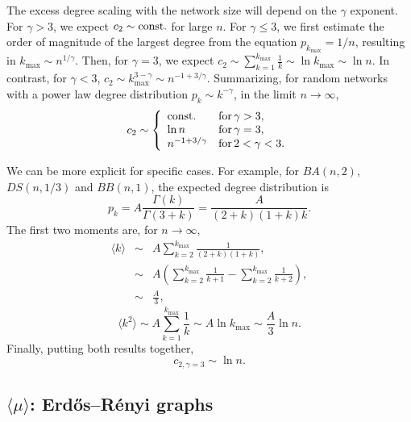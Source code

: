 \documentclass[reprint,aps,pre,amsmath,amssymb,superscriptaddress,showpacs]{revtex4-1}
\begin{document}
The excess degree scaling with the network size will depend on the $\gamma$ exponent. For $\gamma>3$, we expect $c_2\sim {\rm const.}$ for large $n$. For $\gamma \leq 3$, we first estimate the order of magnitude of the largest degree from the equation $p_{k_{\max}} =1/n$, resulting in $k_{\max}\sim n^{1/\gamma}$. Then, for $\gamma=3$, we expect $c_2 \sim \sum_{k=1}^{k_{\max}} \frac{1}{k} \sim \ln k_{\max} \sim \ln n$. In contrast, for $\gamma<3$, $c_2 \sim k_{\max}^{3-\gamma} \sim n^{-1 + 3/\gamma }$. Summarizing, for random networks with a power law degree distribution $p_k\sim k^{-\gamma}$, in the limit $n\rightarrow\infty$,
%
\begin{equation}
c_2 \sim \left\{
\begin{array}{ll}
{\rm const.} & {\rm for\,}\gamma>3,\\
\ln n & {\rm for\,}\gamma=3,\\
n^{-1 + 3/\gamma } & {\rm for\,} 2<\gamma<3.
\end{array}
\right.
\label{c2N}
\end{equation}

We can be more explicit for specific cases. For example, for $BA(n, 2)$, $DS(n, 1/3)$ and $BB(n, 1)$, the expected degree distribution is
%
\begin{equation}
p_k = A\frac{\Gamma(k)}{\Gamma(3+k)} = \frac{A}{(2+k)(1+k)k}.
\end{equation}
%
The first two moments are, for $n\rightarrow\infty$,
%
\begin{eqnarray}
\langle k\rangle &\sim& A \sum_{k=2}^{k_{\max}} \frac{1}{(2+k)(1+k)}, \nonumber\\
&\sim& A\left( \sum_{k=2}^{k_{\max}} \frac{1}{k+1} - \sum_{k=2}^{k_{\max}} \frac{1}{k+2} \right), \nonumber\\
&\sim& \frac{A}{3},
\end{eqnarray}
%
\begin{equation}
\langle k^2\rangle\sim A \sum_{k=1}^{k_{\max}} \frac{1}{k} \sim A \ln k_{\max} \sim \frac{A}{3} \ln n.
\end{equation}
%
Finally, putting both results together, 
%
\begin{equation}
c_{2, \gamma=3} \sim \ln n.
\label{c23}
\end{equation}
%

\subsection*{$\langle\mu\rangle$: Erd\H{o}s--R\'enyi graphs}
\end{document}
